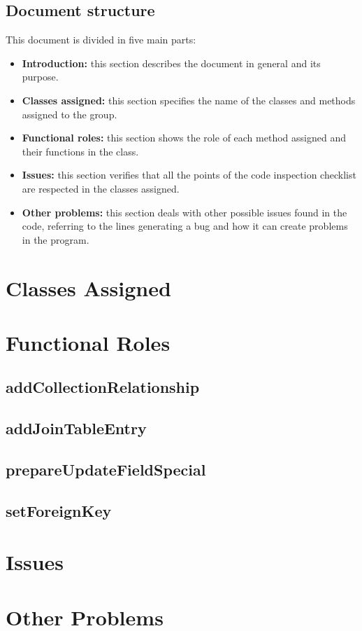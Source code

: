 \documentclass[18pt,oneside,a4paper, titlepage]{article}
\begin{document}
	\subsection{Document structure}
		This document is divided in five main parts:
		\begin{itemize}
			\item \textbf{Introduction:} this section describes the document in general and its purpose.
			\item  \textbf{Classes assigned:} this section specifies the name of the classes and methods assigned to the group.
			\item  \textbf{Functional roles:} this section shows the role of each method assigned and their functions in the class.
			\item  \textbf{Issues:} this section verifies that all the points of the code inspection checklist are respected in the classes assigned.
			\item  \textbf{Other problems:} this section deals with other possible issues found in the code, referring to the lines generating a bug and how it can create problems in the program.
		\end{itemize}

\newpage	
\section{Classes Assigned}

\newpage
\section{Functional Roles}
	\subsection{addCollectionRelationship}
	\subsection{addJoinTableEntry}
	\subsection{prepareUpdateFieldSpecial}
	\subsection{setForeignKey}

\newpage
\section{Issues}

\newpage
\section{Other Problems}
\end{document}
